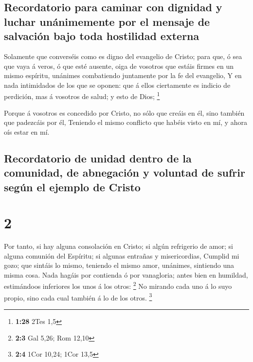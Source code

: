 \hypertarget{recordatorio-para-caminar-con-dignidad-y-luchar-unuxe1nimemente-por-el-mensaje-de-salvaciuxf3n-bajo-toda-hostilidad-externa}{%
\subsection{Recordatorio para caminar con dignidad y luchar unánimemente
por el mensaje de salvación bajo toda hostilidad
externa}\label{recordatorio-para-caminar-con-dignidad-y-luchar-unuxe1nimemente-por-el-mensaje-de-salvaciuxf3n-bajo-toda-hostilidad-externa}}

 Solamente que converséis como es digno del evangelio de
Cristo; para que, ó sea que vaya á veros, ó que esté ausente, oiga de
vosotros que estáis firmes en un mismo espíritu, unánimes combatiendo
juntamente por la fe del evangelio,  Y en nada intimidados
de los que se oponen: que á ellos ciertamente es indicio de perdición,
mas á vosotros de salud; y esto de Dios; \footnote{\textbf{1:28} 2Tes
  1,5}

 Porque á vosotros es concedido por Cristo, no sólo que
creáis en él, sino también que padezcáis por él,  Teniendo
el mismo conflicto que habéis visto en mí, y ahora oís estar en mí.

\hypertarget{recordatorio-de-unidad-dentro-de-la-comunidad-de-abnegaciuxf3n-y-voluntad-de-sufrir-seguxfan-el-ejemplo-de-cristo}{%
\subsection{Recordatorio de unidad dentro de la comunidad, de abnegación
y voluntad de sufrir según el ejemplo de
Cristo}\label{recordatorio-de-unidad-dentro-de-la-comunidad-de-abnegaciuxf3n-y-voluntad-de-sufrir-seguxfan-el-ejemplo-de-cristo}}

\hypertarget{section-1}{%
\section{2}\label{section-1}}

 Por tanto, si hay alguna consolación en Cristo; si algún
refrigerio de amor; si alguna comunión del Espíritu; si algunas entrañas
y misericordias,  Cumplid mi gozo; que sintáis lo mismo,
teniendo el mismo amor, unánimes, sintiendo una misma cosa. 
Nada hagáis por contienda ó por vanagloria; antes bien en humildad,
estimándoos inferiores los unos á los otros: \footnote{\textbf{2:3} Gal
  5,26; Rom 12,10}  No mirando cada uno á lo suyo propio,
sino cada cual también á lo de los otros. \footnote{\textbf{2:4} 1Cor
  10,24; 1Cor 13,5}

